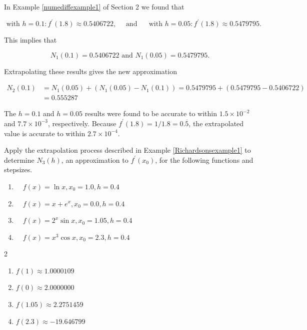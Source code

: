 \begin{mysolution}
In Example \ref{numediffexample1} of Section 2 we found that

$$
\text { with } h=0.1: f^{\prime}(1.8) \approx 0.5406722, \quad \text { and } \quad \text { with } h=0.05: f^{\prime}(1.8) \approx 0.5479795 .
$$

This implies that

$$
N_{1}(0.1)=0.5406722 \text { and } N_{1}(0.05)=0.5479795 .
$$

Extrapolating these results gives the new approximation

$$
\begin{aligned}
N_{2}(0.1) & =N_{1}(0.05)+\left(N_{1}(0.05)-N_{1}(0.1)\right)=0.5479795+(0.5479795-0.5406722) \\
& =0.555287
\end{aligned}
$$

The $h=0.1$ and $h=0.05$ results were found to be accurate to within $1.5 \times 10^{-2}$ and $7.7 \times 10^{-3}$, respectively. Because $f^{\prime}(1.8)=1 / 1.8=0 . \overline{5}$, the extrapolated value is accurate to within $2.7 \times 10^{-4}$.
\end{mysolution}
\begin{myexercise}%
Apply the extrapolation process described in Example \ref{Richardsonsexample1} to determine $N_{3}(h)$, an approximation to $f^{\prime}\left(x_{0}\right)$, for the following functions and stepsizes.
\begin{enumerate}[label=(\alph*)]
\item $\quad f(x)=\ln x, x_{0}=1.0, h=0.4$\\
\item $\quad f(x)=x+e^{x}, x_{0}=0.0, h=0.4$\\
\item $\quad f(x)=2^{x} \sin x, x_{0}=1.05, h=0.4$\\
\item $\quad f(x)=x^{3} \cos x, x_{0}=2.3, h=0.4$
\end{enumerate}

\begin{mysolution}
\begin{multicols}{2}
\begin{enumerate}[label=(\alph*)]
\item $f(1)\approx1.0000109$ \item $f(0)\approx2.0000000$ \item $f(1.05)\approx2.2751459$ \item $f(2.3)\approx-19.646799$
\end{enumerate}
\end{multicols}
\end{mysolution}
\end{myexercise}



